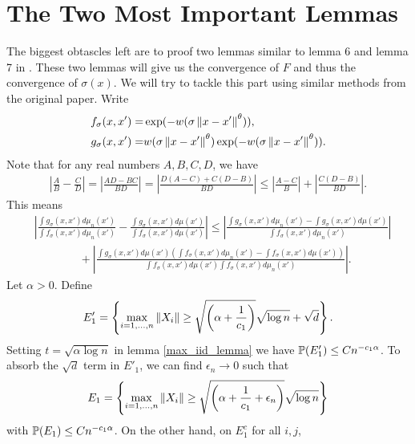 \documentclass[10pt]{article}
\begin{document}
\section{The Two Most Important Lemmas}
The biggest obtascles left are to proof two lemmas similar to lemma 6 and lemma
7 in \cite{auffinger-tsne}. These two lemmas will give us the convergence of
$F$ and thus the convergence of $\sigma(x)$. We will try to tackle this part
using similar methods from the original paper. Write
\begin{align}
  f_{\sigma}(x,x') = & \exp(-w(\sigma\left\lVert x-x'\right\rVert^{\theta})),  \nonumber                   \\
  g_{\sigma}(x,x') = & w(\sigma\left\lVert x-x'\right\rVert^{\theta})\exp(-w(\sigma\left\lVert x-x'\right\rVert^{\theta})).
\end{align}
Note that for any real numbers $A,B,C,D$, we have
\begin{align}
  \left|\frac{A}{B}-\frac{C}{D}\right| = \left|\frac{AD-BC}{BD}\right| = \left|\frac{D(A-C)+C(D-B)}{BD}\right| \leq \left|\frac{A-C}{B}\right|+\left|\frac{C(D-B)}{BD} \right|.
\end{align}
This means
\begin{align} \label{important_lemmas:triangle_inequality}
   & \left|\frac{\int g_{\sigma}(x,x') d\mu_n(x')}{\int f_{\sigma}(x,x') d\mu_n(x')}-\frac{\int g_{\sigma}(x,x') d\mu(x')}{\int f_{\sigma}(x,x') d\mu(x')}\right| \leq \left|\frac{\int g_{\sigma}(x,x') d\mu_n(x')-\int g_{\sigma}(x,x') d\mu(x')}{\int f_{\sigma}(x,x') d\mu_n(x')}\right| \nonumber \\
   & \qquad \qquad + \left|\frac{\int g_{\sigma}(x,x')d\mu(x')(\int f_{\sigma}(x,x') d\mu_n(x')-\int f_{\sigma}(x,x') d\mu(x'))}{\int f_{\sigma}(x,x')d\mu(x')\int f_{\sigma}(x,x') d\mu_n(x')} \right|.
\end{align}
Let $\alpha >0$. Define
\begin{align}
  E'_1 = \left\{\max_{i = 1,\dots,n}\left\lVert X_i\right\rVert \geq \sqrt{\left(\alpha+\frac{1}{c_1}\right)}\sqrt{\log n} + \sqrt{d}\right\}.
\end{align}
Setting $t = \sqrt{\alpha \log n}$ in lemma \ref{max_iid_lemma} we have $\mathbb{P}(E'_1) \leq Cn^{-c_1 \alpha}$. To absorb the $\sqrt{d}$ term in $E'_1$, we can find $\epsilon_n \to 0$ such that
\begin{align}
  E_1 = \left\{\max_{i = 1,\dots,n}\left\lVert X_i\right\rVert \geq \sqrt{\left(\alpha+\frac{1}{c_1}+\epsilon_n \right)}\sqrt{\log n}\right\}
\end{align}
with $\mathbb{P}(E_1) \leq Cn^{-c_1 \alpha}$. On the other hand, on $E_1^c$ for all $i,j$,
\end{document}
